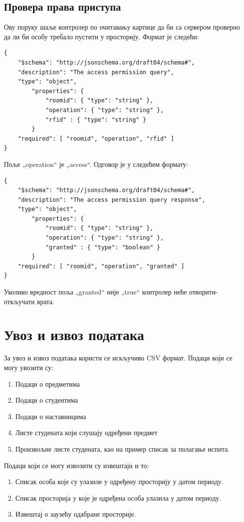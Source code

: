 \documentclass[a4paper, 12pt, diplomski]{etfcyr}
\def\quote#1{„#1“}
\begin{document}
			\subsection{Провера права приступа}
				\begin{justify}
					Ову поруку шаље контролер по очитавању картице да би са сервером проверио да ли би особу требало пустити у просторију. Формат је следећи:
					\begin{lstlisting}
{
	"$schema": "http://json­schema.org/draft­04/schema#",
	"description": "The access permission query",
	"type": "object",
		"properties": {
			"room­id": { "type": "string" },
			"operation": { "type": "string" },
			"rfid" : { "type": "string" }
		}
	"required": [ "room­id", "operation", "rfid" ]
}
					\end{lstlisting}
					Поље \quote{operation} је \quote{access}. Одговор је у следећем формату:
					\begin{lstlisting}
{
	"$schema": "http://json­schema.org/draft­04/schema#",
	"description": "The access permission query response",
	"type": "object",
		"properties": {
			"room­id": { "type": "string" },
			"operation": { "type": "string" },
			"granted" : { "type": "boolean" }
		}
	"required": [ "room­id", "operation", "granted" ]
}
					\end{lstlisting}
					Уколико вредност поља \quote{granted} није \quote{true} контролер неће отворити-откључати врата.
				\end{justify}

		\section{Увоз и извоз података}
			\begin{justify}
				За увоз и извоз података користи се искључиво CSV формат. Подаци који се могу увозити су:
				\begin{enumerate}[noitemsep]
					\item Подаци о предметима
					\item Подаци о студентима
					\item Подаци о наставницима
					\item Листе студената који слушају одређени предмет
					\item Произвољне листе студената, као на пример списак за полагање испита.
				\end{enumerate}
				Подаци који се могу извозити су извештаји и то:
				\begin{enumerate}[noitemsep]
					\item Списак особа које су улазиле у одређену просторију у датом периоду.
					\item Списак просторија у које је одређена особа улазила у датом периоду.
					\item Извештај о заузећу одабране просторије.
				\end{enumerate}
			\end{justify}
\end{document}
